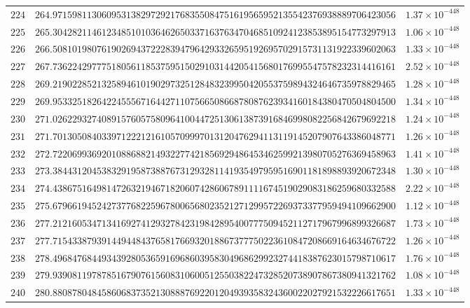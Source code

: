 \documentclass[12pt,reqno]{amsart}
\theoremstyle{remark}
\begin{document}
\begin{longtable}{clc}
$224$ & $264.9715981130609531382972921768355084751619565952135542376938889706423056$ & $1.37\times 10^{-448}$ \\
$225$ & $265.3042821146123485101036462650337163763470468510924123853895154773297913$ & $1.06\times 10^{-448}$ \\
$226$ & $266.5081019807619026943722283947964293326595192695702915731131922339602063$ & $1.33\times 10^{-448}$ \\
$227$ & $267.7362242977751805611853759515029103144205415680176995547578232314416161$ & $2.52\times 10^{-448}$ \\
$228$ & $269.2190228521325894610190297325128483239950420553759894324646735978829465$ & $1.28\times 10^{-448}$ \\
$229$ & $269.9533251826422455567164427110756650866878087623934160184380470504804500$ & $1.34\times 10^{-448}$ \\
$230$ & $271.0262293274089157605758096410044725130613873916846998082256842679692218$ & $1.24\times 10^{-448}$ \\
$231$ & $271.7013050840339712221216105709997013120476294113119145207907643386048771$ & $1.26\times 10^{-448}$ \\
$232$ & $272.7220699369201088688214932277421856929486453462599213980705276369458963$ & $1.41\times 10^{-448}$ \\
$233$ & $273.3844312045383291958738876731293281141935497959516901181898893920672348$ & $1.30\times 10^{-448}$ \\
$234$ & $274.4386751649814726321946718206074286067891111674519029083186259680332588$ & $2.22\times 10^{-448}$ \\
$235$ & $275.6796619452427377682259678006568023521271299572269373377959494109662900$ & $1.12\times 10^{-448}$ \\
$236$ & $277.2121605347134169274129327842319842895400777509452112717967996899326687$ & $1.73\times 10^{-448}$ \\
$237$ & $277.7154338793914494484376581766932018867377750223610847208669164634676722$ & $1.26\times 10^{-448}$ \\
$238$ & $278.4968476844934392805365916968603958304968629923274418387623015798710617$ & $1.76\times 10^{-448}$ \\
$239$ & $279.9390811978785167907615608310600512550382247328520738907867380941321762$ & $1.08\times 10^{-448}$ \\
$240$ & $280.8808780484586068373521308887692201204939358324360022027921532226617651$ & $1.33\times 10^{-448}$ \\

\end{longtable}
\end{document}
